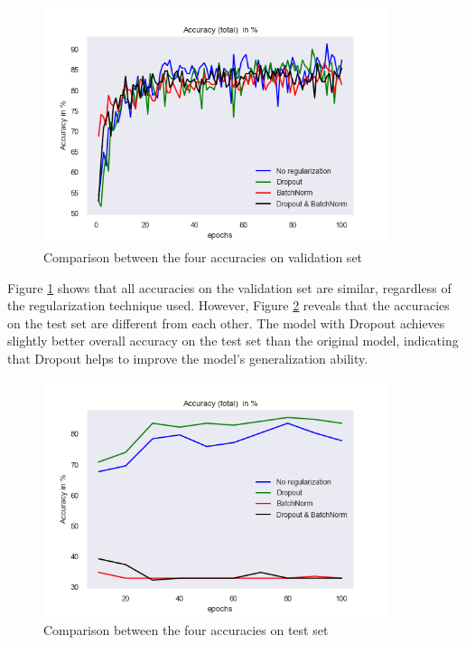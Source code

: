 \documentclass[a4paper]{article}
\begin{document}
\begin{figure}[H]
    \centering
    \includegraphics[width=0.9\textwidth]{img/baptiste/baptiste_val_accuracies_comparison.png}
    \caption{Comparison between the four accuracies on validation set}
    \label{val-accuracies}
\end{figure}

Figure \ref{val-accuracies} shows that all accuracies on the validation set are similar, regardless of the regularization technique used. However, Figure \ref{test-accuracies} reveals that the accuracies on the test set are different from each other. The model with Dropout achieves slightly better overall accuracy on the test set than the original model, indicating that Dropout helps to improve the model's generalization ability.



\begin{figure}[H]
    \centering
    \includegraphics[width=0.9\textwidth]{img/baptiste/baptiste_test_accuracies_comparison.png}
    \caption{Comparison between the four accuracies on test set}
    \label{test-accuracies}
\end{figure}
\end{document}
